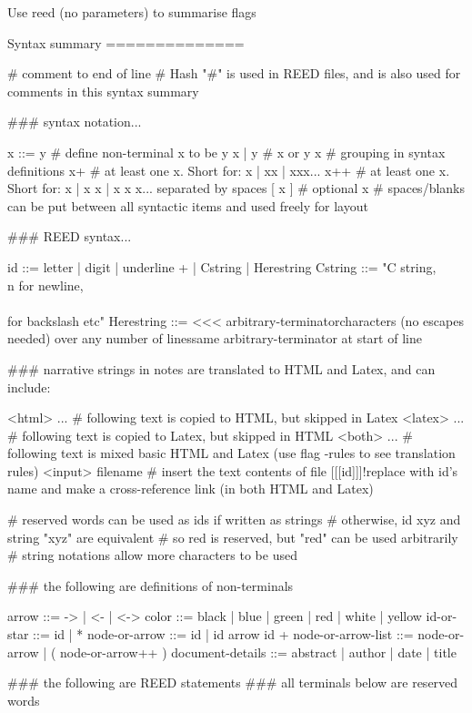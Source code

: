 Use reed (no parameters) to summarise flags

Syntax summary
==============

# comment to end of line
# Hash "#" is used in REED files, and is also used for comments in this syntax summary

### syntax notation...

x ::= y # define non-terminal x to be y
x | y   # x or y
{ x }   # grouping in syntax definitions
x+      # at least one x. Short for: x | xx | xxx...
x++     # at least one x. Short for: x | x x | x x x... separated by spaces
[ x ]   # optional x
        # spaces/blanks can be put between all syntactic items and used freely for layout 

### REED syntax...

id ::= { letter | digit | underline }+ | Cstring | Herestring
Cstring ::= "C string, \\n for newline, \\\\ for backslash etc" 
Herestring ::= <<< arbitrary-terminator\n                           characters (no escapes needed) over any number of lines\n                       same arbitrary-terminator at start of line

### narrative strings in notes are translated to HTML and Latex, and can include:

<html> ...        # following text is copied to HTML, but skipped in Latex
<latex> ...       # following text is copied to Latex, but skipped in HTML
<both> ...        # following text is mixed basic HTML and Latex (use flag -rules to see translation rules)
<input> filename  # insert the text contents of file
[[[id]]]!replace with id's name and make a cross-reference link (in both HTML and Latex)

# reserved words can be used as ids if written as strings
# otherwise, id xyz and string "xyz" are equivalent
# so red is reserved, but "red" can be used arbitrarily
# string notations allow more characters to be used

### the following are definitions of non-terminals

arrow ::= -> | <- | <->
color ::= black | blue | green | red | white | yellow
id-or-star ::= id | *
node-or-arrow ::= id | id { arrow id }+
node-or-arrow-list ::= node-or-arrow | ( node-or-arrow++ )
document-details ::= abstract | author | date | title

### the following are REED statements
### all terminals below are reserved words

